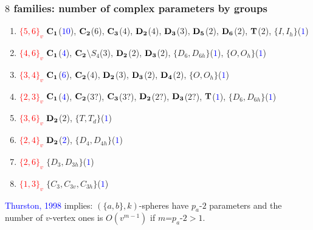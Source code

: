 \documentclass{beamer}
\begin{document}
\begin{frame}
\frametitle{$8$ families: number of complex parameters by groups}
\vspace{-1.5mm}

\begin{enumerate}
\item
\textcolor{red}{$\{5,6\}_v$}
${\bf C_1}$(\textcolor{blue}{{\bf $10$}}),  ${\bf C_2}$($6$), ${\bf C_3}$($4$),  ${\bf D_2}$($4$),  
${\bf D_3}$($3$), ${\bf
D_5}$($2$),  ${\bf D_6}$($2$), ${\bf T}$($2$),  $\{I,I_h\}$(\textcolor{blue}{{\bf $1$}})
\item
\textcolor{red}{$\{4,6\}_v$} ${\bf 
C_1}$(\textcolor{blue}{{\bf $4$}}),
${\bf C_2}$$\setminus$$ S_{4}$($3$), ${\bf D_2}$($2$), ${\bf D_3}$($2$),  $\{D_6,D_{6h}\}$(\textcolor{blue}{{\bf $1$}}), 
$\{O,O_h\}$(\textcolor{blue}{{\bf $1$}})
\item
\textcolor{red}{$\{3, 4\}_v$} ${\bf 
C_{1}}$(\textcolor{blue}{{\bf $6$}}),
${\bf C_2}$($4$),  ${\bf D_2}$($3$),
${\bf D_3}$($2$), ${\bf D_4}$($2$), $\{O,O_h\}$(\textcolor{blue}{{\bf $1$}})
\item
\textcolor{red}{$\{2, 3\}_v$}  
${\bf C_1}$(\textcolor{blue}{{\bf $4$}}),
${\bf C_2}$($3?$), ${\bf C_3}$($3?$), ${\bf D_2}$($2?$), ${\bf 
D_3}$($2?$), ${\bf T}$(\textcolor{blue}{{\bf $1$}}),  
$\{D_6,D_{6h}\}$(\textcolor{blue}{{\bf $1$}})

\item
\textcolor{red}{$\{3,6\}_v$} ${\bf D_{2}}$($2$),
$\{T,T_d\}$(\textcolor{blue}{{\bf $1$}})
\item
\textcolor{red}{$\{2, 4\}_v$} ${\bf 
D_2}$(\textcolor{blue}{{\bf $2$}}),
$\{D_4,D_{4h}\}$(\textcolor{blue}{{\bf $1$}})

\item
\textcolor{red}{$\{2, 6\}_v$} 
$\{D_3,D_{3h}\}$(\textcolor{blue}{{\bf $1$}})
\item
\textcolor{red}{$\{1, 3\}_v$} 
$\{C_{3},C_{3v},C_{3h}\}$(\textcolor{blue}{{\bf $1$}})

\end{enumerate}
\textcolor{blue}{Thurston, 1998} implies: $(\{a,b\},k)$-spheres 
 have $p_{a}$-$2$ parameters and the number of $ v$-vertex ones is 
$O(v^{m-1})$ if $m$=$p_a$-$2>1$.

\end{frame}
\end{document}
